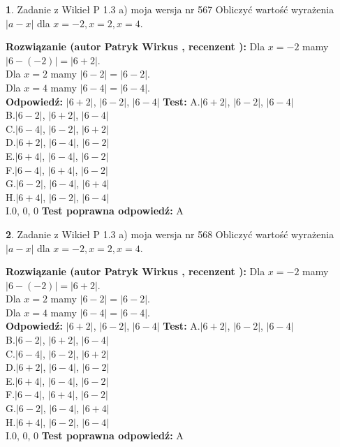 \documentclass[12pt, a4paper]{article}
\theoremstyle{definition} %
\newtheorem{zad}{}
\newcommand{\zadStart}[1]{\begin{zad}#1\newline}
\newcommand{\zadStop}{\end{zad}}
\newcommand{\rozwStart}[2]{\noindent \textbf{Rozwiązanie (autor #1 , recenzent #2): }\newline}
\newcommand{\rozwStop}{\newline}
\newcommand{\odpStart}{\noindent \textbf{Odpowiedź:}\newline}
\newcommand{\odpStop}{\newline}
\newcommand{\testStart}{\noindent \textbf{Test:}\newline}
\newcommand{\testStop}{\newline}
\newcommand{\kluczStart}{\noindent \textbf{Test poprawna odpowiedź:}\newline}
\newcommand{\kluczStop}{\newline}
\begin{document}
\zadStart{Zadanie z Wikieł P 1.3 a) moja wersja nr 567}
Obliczyć wartość wyrażenia $|a - x|$ dla $x=-2,x=2,x=4$.
\zadStop
\rozwStart{Patryk Wirkus}{}
Dla $x = -2$ mamy $|6 - (-2)| = |6 + 2|$.\\
Dla $x = 2$ mamy $|6 - 2| = |6 - 2|$.\\
Dla $x = 4$ mamy $|6 - 4| = |6 - 4|$.\\
\rozwStop
\odpStart
$|6 + 2|$, $|6 - 2|$, $|6 - 4|$
\odpStop
\testStart
A.$|6 + 2|$, $|6 - 2|$, $|6 - 4|$\\
B.$|6 - 2|$, $|6 + 2|$, $|6 - 4|$\\
C.$|6 - 4|$, $|6 - 2|$, $|6 + 2|$\\
D.$|6 + 2|$, $|6 - 4|$, $|6 - 2|$\\
E.$|6 + 4|$, $|6 - 4|$, $|6 - 2|$\\
F.$|6 - 4|$, $|6 + 4|$, $|6 - 2|$\\
G.$|6 - 2|$, $|6 - 4|$, $|6 + 4|$\\
H.$|6 + 4|$, $|6 - 2|$, $|6 - 4|$\\
I.$0$, $0$, $0$
\testStop
\kluczStart
A
\kluczStop



\zadStart{Zadanie z Wikieł P 1.3 a) moja wersja nr 568}
Obliczyć wartość wyrażenia $|a - x|$ dla $x=-2,x=2,x=4$.
\zadStop
\rozwStart{Patryk Wirkus}{}
Dla $x = -2$ mamy $|6 - (-2)| = |6 + 2|$.\\
Dla $x = 2$ mamy $|6 - 2| = |6 - 2|$.\\
Dla $x = 4$ mamy $|6 - 4| = |6 - 4|$.\\
\rozwStop
\odpStart
$|6 + 2|$, $|6 - 2|$, $|6 - 4|$
\odpStop
\testStart
A.$|6 + 2|$, $|6 - 2|$, $|6 - 4|$\\
B.$|6 - 2|$, $|6 + 2|$, $|6 - 4|$\\
C.$|6 - 4|$, $|6 - 2|$, $|6 + 2|$\\
D.$|6 + 2|$, $|6 - 4|$, $|6 - 2|$\\
E.$|6 + 4|$, $|6 - 4|$, $|6 - 2|$\\
F.$|6 - 4|$, $|6 + 4|$, $|6 - 2|$\\
G.$|6 - 2|$, $|6 - 4|$, $|6 + 4|$\\
H.$|6 + 4|$, $|6 - 2|$, $|6 - 4|$\\
I.$0$, $0$, $0$
\testStop
\kluczStart
A
\kluczStop
\end{document}
